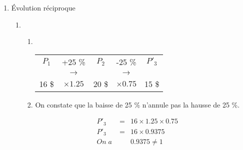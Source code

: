 \documentclass[12pt,a4paper]{article}
\begin{document}
\begin{enumerate}[label=\Alph*.]
\begin{enumerate}[label=\arabic*)]
		On peut aussi calculer indépendamment des prix : $\num{1.25} \times \num{1.30} = \num{1.625}$, soit une hausse globale de \num{62.5} \%.\\
		
		\begin{myrem}
			Le pourcentage de hausse globale \num{62.5} \% n'est pas égal à la somme des deux pourcentages de hausse successives \num{25} \% et \num{30} \%, car ces deux pourcentages ne s'appliquent pas sur le même prix, donc ne s'additionnent pas.
		\end{myrem}
		
		\begin{mybilan2}{\'Evolutions successives}
			Deux évolutions (hausse ou baisse) successives de coefficients multiplicateurs $c$ et $c'$  correspondent  une évolution globale (hausse ou baisse) de $c \times c'$ (on multiplie).
		\end{mybilan2}
	\end{enumerate}
	
	\item \'Evolution réciproque
	\begin{enumerate}[label=\arabic*)]
		\item 
		\begin{enumerate}[label=\alph*)]
			\item \ 
			\begin{table}[h!]
				\centering{\ }
				\begin{tabular}{|@{\ \ }c@{\ \ }c@{\ \ }c@{\ \ }c@{\ \ }c@{\ \ }|}
					\hline
					$P_1$ & +\num{25} \%  & $P_2$ & -\num{25} \%  & $P'_3$ \\
					& {\LARGE$\rightarrow$} &	&	 {\LARGE$\rightarrow$} &	\\
					\num{16} \$ & $\times \num{1.25} $ & 20 \$ &  $\times \num{0.75}$ & \num{15} \$ \\
					\hline
				\end{tabular}
				
			\end{table}
			
			\item On constate que la baisse de \num{25} \% n'annule pas la hausse de \num{25} \%.
		\end{enumerate}
		
		\begin{myrem}
			\begin{eqnarray*}
				P'_3 &=& \num{16} \times \num{1.25} \times \num{0.75} \\
				P'_3 &=& \num{16} \times \num{0.9375} \\
				On\;a\; & &\num{0.9375} \neq 1
			\end{eqnarray*}
		\end{myrem}
		

\end{enumerate}
\end{enumerate}
\end{document}
